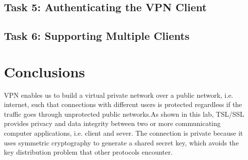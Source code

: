 \documentclass[12pt]{article}
\begin{document}
\subsection{Task 5: Authenticating the VPN Client}
\subsection{Task 6: Supporting Multiple Clients}












\section{Conclusions}
VPN enables us to build a virtual private network over a public network, i.e. internet, such that connections with different users is protected regardless if the traffic goes through unprotected public networks.As shown in this lab, TSL/SSL provides privacy and data integrity between two or more communicating computer applications, i.e. client and sever. The connection is private because it uses symmetric cryptography to generate a shared secret key, which avoids the key distribution problem that other protocols encounter. 
\end{document}
